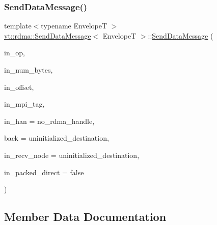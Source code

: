 \subsubsection{\texorpdfstring{Send\+Data\+Message()}{SendDataMessage()}\hspace{0.1cm}{\footnotesize\ttfamily [2/2]}}
{\footnotesize\ttfamily template$<$typename EnvelopeT $>$ \\
\hyperlink{structvt_1_1rdma_1_1_send_data_message}{vt\+::rdma\+::\+Send\+Data\+Message}$<$ EnvelopeT $>$\+::\hyperlink{structvt_1_1rdma_1_1_send_data_message}{Send\+Data\+Message} (\begin{DoxyParamCaption}\item[{\hyperlink{namespacevt_1_1rdma_a9b966d9780a2b41afe7cd7b7b4b20300}{R\+D\+M\+A\+\_\+\+Op\+Type} const \&}]{in\+\_\+op,  }\item[{\hyperlink{namespacevt_aab8d55968084610ce3b17057981e9300}{Byte\+Type} const \&}]{in\+\_\+num\+\_\+bytes,  }\item[{\hyperlink{namespacevt_aab8d55968084610ce3b17057981e9300}{Byte\+Type} const \&}]{in\+\_\+offset,  }\item[{\hyperlink{namespacevt_a84ab281dae04a52a4b243d6bf62d0e52}{Tag\+Type} const \&}]{in\+\_\+mpi\+\_\+tag,  }\item[{\hyperlink{namespacevt_a10442579ec4e7ebef223818e64bcf908}{R\+D\+M\+A\+\_\+\+Handle\+Type} const \&}]{in\+\_\+han = {\ttfamily no\+\_\+rdma\+\_\+handle},  }\item[{\hyperlink{namespacevt_a866da9d0efc19c0a1ce79e9e492f47e2}{Node\+Type} const \&}]{back = {\ttfamily uninitialized\+\_\+destination},  }\item[{\hyperlink{namespacevt_a866da9d0efc19c0a1ce79e9e492f47e2}{Node\+Type} const \&}]{in\+\_\+recv\+\_\+node = {\ttfamily uninitialized\+\_\+destination},  }\item[{bool const}]{in\+\_\+packed\+\_\+direct = {\ttfamily false} }\end{DoxyParamCaption})\hspace{0.3cm}{\ttfamily [inline]}}



\subsection{Member Data Documentation}
\mbox{\label{structvt_1_1rdma_1_1_send_data_message_a012836b7e2327b722e73bb52f416fe25}} 
